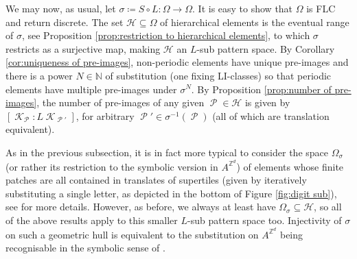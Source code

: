 \documentclass[11pt]{amsart}
\numberwithin{equation}{section}
\theoremstyle{plain}
\theoremstyle{definition}
\newcommand{\Z}{\mathbb Z}
\newcommand{\N}{\mathbb N}
\newcommand{\sH}{\mathscr{H}}
\newcommand{\sub}{\sigma}
\DeclareMathOperator{\cP}{\mathcal{P}}
\DeclareMathOperator{\cK}{\mathcal{K}}
\begin{document}
We may now, as usual, let \(\sub \coloneqq S \circ L \colon \Omega \to \Omega\). It is easy to show that \(\Omega\) is FLC and return discrete. The set \(\sH \subseteq \Omega\) of hierarchical elements is the eventual range of \(\sub\), see Proposition \ref{prop:restriction to hierarchical elements}, to which \(\sub\) restricts as a surjective map, making \(\sH\) an \(L\)-sub pattern space. By Corollary \ref{cor:uniqueness of pre-images}, non-periodic elements have unique pre-images and there is a power \(N \in \N\) of substitution (one fixing LI-classes) so that periodic elements have multiple pre-images under \(\sub^N\). By Proposition \ref{prop:number of pre-images}, the number of pre-images of any given \(\cP \in \sH\) is given by \([\cK_{\cP} : L\cK_{\cP'}]\), for arbitrary \(\cP' \in \sub^{-1}(\cP)\) (all of which are translation equivalent).

As in the previous subsection, it is in fact more typical to consider the space \(\Omega_\sub\) (or rather its restriction to the symbolic version in \(A^{\Z^d}\)) of elements whose finite patches are all contained in translates of supertiles (given by iteratively substituting a single letter, as depicted in the bottom of Figure \ref{fig:digit sub}), see \cite{Cab23} for more details. However, as before, we always at least have \(\Omega_\sub \subseteq \sH\), so all of the above results apply to this smaller \(L\)-sub pattern space too. Injectivity of \(\sub\) on such a geometric hull is equivalent to the substitution on \(A^{\Z^d}\) being recognisable in the symbolic sense of \cite[Definition 3.4]{Cab23}.




\end{document}
